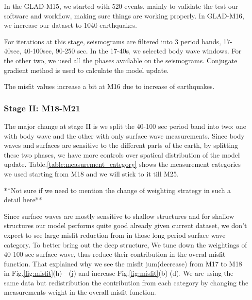 \documentclass[extra,mreferee]{gji}
\begin{document}
In the GLAD-M15, we started with 520 events, mainly to validate the test our
software and workflow, making sure things are working properly.
In GLAD-M16, we increase our dataset to 1040 earthquakes.

For iterations at this stage, seismograms are filtered into 3 period bands,
17-40sec, 40-100sec, 90-250 sec. In the 17-40s, we selected body wave windows. For the
other two, we used all the phases available on the seismograms. Conjugate
gradient method is used to calculate the model update.

The misfit values increase a bit at M16 due to increase of earthquakes.

\subsubsection{Stage II: M18-M21}

The major change at stage II is we split the 40-100 sec period band into two: one with
body wave and the other with only surface wave measurements. Since body waves and
surfaces are sensitive to the different parts of the earth, by splitting these two
phases, we have more controls over spatical distribution of the model update.
Table.\ref{table:measurement_category} shows the measurement categories we used starting
from M18 and we will stick to it till M25.

**Not sure if we need to mention the change of weighting strategy in such a detail here**

Since surface waves are mostly sensitive to shallow
structures and for shallow structures our model performs quite good
already given current dataset, we don't expect to see large misfit
reduction from in those long period surface wave category.
To better bring out the deep structure, We tune
down the weightings of 40-100 sec surface wave, thus reduce their
contribution in the overal misfit function. That explained why we see the
misfit jum(decrease) from M17 to M18 in Fig.\ref{fig:misfit}(h) - (j) and
increase Fig.\ref{fig:misfit}(b)-(d). We are using the same data but
redistribution the contribution from each category by changing the measurements
weight in the overall misfit function.
\end{document}
